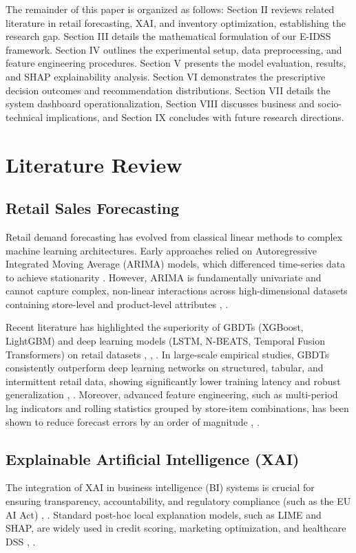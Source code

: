 \documentclass[conference]{IEEEtran}
\begin{document}
The remainder of this paper is organized as follows: Section II reviews related literature in retail forecasting, XAI, and inventory optimization, establishing the research gap. Section III details the mathematical formulation of our E-IDSS framework. Section IV outlines the experimental setup, data preprocessing, and feature engineering procedures. Section V presents the model evaluation, results, and SHAP explainability analysis. Section VI demonstrates the prescriptive decision outcomes and recommendation distributions. Section VII details the system dashboard operationalization, Section VIII discusses business and socio-technical implications, and Section IX concludes with future research directions.

\section{Literature Review}

\subsection{Retail Sales Forecasting}
Retail demand forecasting has evolved from classical linear methods to complex machine learning architectures. Early approaches relied on Autoregressive Integrated Moving Average (ARIMA) models, which differenced time-series data to achieve stationarity \cite{mustapha2025forecasting}. However, ARIMA is fundamentally univariate and cannot capture complex, non-linear interactions across high-dimensional datasets containing store-level and product-level attributes \cite{yeesin2024application}, \cite{venkiteela2025machine}. 

Recent literature has highlighted the superiority of GBDTs (XGBoost, LightGBM) and deep learning models (LSTM, N-BEATS, Temporal Fusion Transformers) on retail datasets \cite{hobor2026comparative}, \cite{swami2020predicting}, \cite{malik2024sales}. In large-scale empirical studies, GBDTs consistently outperform deep learning networks on structured, tabular, and intermittent retail data, showing significantly lower training latency and robust generalization \cite{hobor2026comparative}, \cite{swami2020predicting}. Moreover, advanced feature engineering, such as multi-period lag indicators and rolling statistics grouped by store-item combinations, has been shown to reduce forecast errors by an order of magnitude \cite{mitra2022comparative}, \cite{alghurabli2025ai}.

\subsection{Explainable Artificial Intelligence (XAI)}
The integration of XAI in business intelligence (BI) systems is crucial for ensuring transparency, accountability, and regulatory compliance (such as the EU AI Act) \cite{madabhushini2025explainable}, \cite{hossain2026ethical}. Standard post-hoc local explanation models, such as LIME and SHAP, are widely used in credit scoring, marketing optimization, and healthcare DSS \cite{lin2026critical}, \cite{meshram2025explainable}. 
\end{document}
